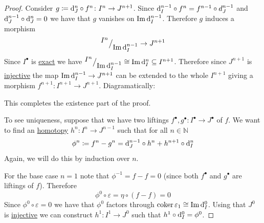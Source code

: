 \documentclass[../../main]{subfiles}
\begin{document}
\begin{proof}
  Consider \(g \coloneq \mathrm{d}_{J}^{n} \circ f^{n}\colon I^{n} \to J^{n+1}\).
  Since \(\mathrm{d}_{I}^{n-1} \circ f^{n} = f^{n-1} \circ d_{J}^{n-1}\) and \(\mathrm{d}_{J}^{n-1} \circ \mathrm{d}_{J}^{n} = 0\) we have that \(g\) vanishes on \(\operatorname{Im} \mathrm{d}_{I}^{n-1}\).
  Therefore \(g\) induces a morphism
  \begin{equation*}
    {^{\textstyle I^{n}}\big/_{\textstyle \operatorname{Im} \mathrm{d}_{I}^{n-1}}} \to J^{n+1}
  \end{equation*}
  Since \(I^{\bullet}\) is \hyperref[def:exact-sequence]{exact} we have \({^{\textstyle I^{n}}\big/_{\textstyle \operatorname{Im} \mathrm{d}_{I}^{n-1}}} \cong \operatorname{Im} \mathrm{d}_{I}^{n} \subseteq I^{n+1}\).
  Therefore since \(J^{n+1}\) is \hyperref[def:injective-projective-object]{injective} the map \(\operatorname{Im} \mathrm{d}_{I}^{n-1} \to J^{n+1}\) can be extended to the whole \(I^{n+1}\) giving a morphism \(f^{n+1}\colon I^{n+1} \to J^{n+1}\).
  Diagramatically:
  \begin{center}
  \end{center}
  This completes the existence part of the proof.

  To see uniqueness, suppose that we have two liftings \(f^{\bullet}, g^{\bullet}\colon I^{\bullet} \to J^{\bullet}\) of \(f\).
  We want to find an \hyperref[def:homotopy]{homotopy} \(h^{n}\colon I^{n} \to J^{n-1}\) such that for all \(n \in \mathbb{N}\)
  \begin{equation*}
    \phi^{n} \coloneq f^{n} - g^{n} = \mathrm{d}_{J}^{n-1} \circ h^{n} + h^{n+1} \circ \mathrm{d}_{I}^{n}
  \end{equation*}
  Again, we will do this by induction over \(n\).
  
  For the base case \(n = 1\) note that \(\phi^{-1} = f - f = 0\) (since both \(f^{\bullet}\) and \(g^{\bullet}\) are liftings of \(f\)).
  Therefore
  \begin{equation*}
    \phi^{0} \circ \varepsilon = \eta \circ (f - f) = 0
  \end{equation*}
  Since \(\phi^{0} \circ \varepsilon = 0\) we have that \(\phi^{0}\) factors through \(\operatorname*{coker} \varepsilon_{1} \cong \operatorname{Im} \mathrm{d}_{I}^{0}\).
  Using that \(J^{0}\) is \hyperref[def:injective-projective-object]{injective} we can construct \(h^{1}\colon I^{1} \to J^{0}\) such that \(h^{1} \circ \mathrm{d}_{I}^{0} = \phi^{0}\).


\end{proof}
\end{document}
